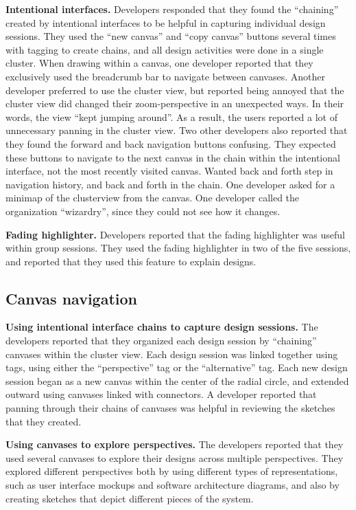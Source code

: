 \textbf{Intentional interfaces.} Developers responded that they found the ``chaining'' created by intentional interfaces to be helpful in capturing individual design sessions. They used the ``new canvas'' and ``copy canvas'' buttons several times with tagging to create chains, and all design activities were done in a single cluster. When drawing within a canvas, one developer reported that they exclusively used the breadcrumb bar to navigate between canvases. Another developer preferred to use the cluster view, but reported being annoyed that the cluster view did changed their zoom-perspective in an unexpected ways. In their words, the view ``kept jumping around''. As a result, the users reported a lot of unnecessary panning in the cluster view. Two other developers also reported that they found the forward and back navigation buttons confusing. They expected these buttons to navigate to the next canvas in the chain within the intentional interface, not the most recently visited canvas. Wanted back and forth step in navigation history, and back and forth in the chain. One developer asked for a minimap of the clusterview from the canvas. One developer called the organization ``wizardry'', since they could not see how it changes.

\textbf{Fading highlighter.} Developers reported that the fading highlighter was useful within group sessions. They used the fading highlighter in two of the five sessions, and reported that they used this feature to explain designs.

\subsection{Canvas navigation}

\textbf{Using intentional interface chains to capture design sessions.} The developers reported that they organized each design session by ``chaining'' canvases within the cluster view. Each design session was linked together using tags, using either the ``perspective'' tag or the ``alternative'' tag. Each new design session began as a new canvas within the center of the radial circle, and extended outward using canvases linked with connectors. A developer reported that panning through their chains of canvases was helpful in reviewing the sketches that they created.

\textbf{Using canvases to explore perspectives.} The developers reported that they used several canvases to explore their designs across multiple perspectives. They explored different perspectives both by using different types of representations, such as user interface mockups and software architecture diagrams, and also by creating sketches that depict different pieces of the system. 


